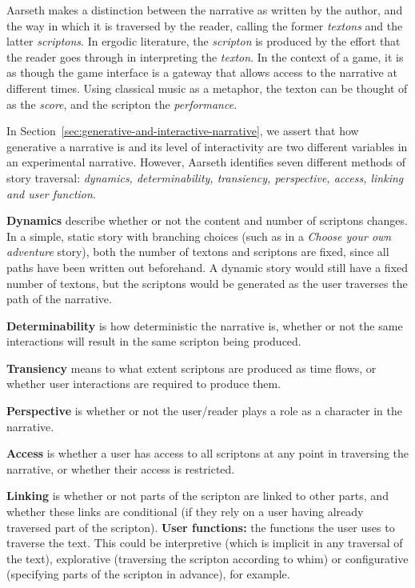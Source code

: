 \documentclass[11pt]{report}
\begin{document}
Aarseth makes a distinction between the narrative as written by the author, and the way in which it is traversed by the reader, calling the former \emph{textons} and the latter \emph{scriptons}. In ergodic literature, the \emph{scripton} is produced by the effort that the reader goes through in interpreting the \emph{texton}. In the context of a game, it is as though the game interface is a gateway that allows access to the narrative at different times. Using classical music as a metaphor, the texton can be thought of as the \emph{score}, and the scripton the \emph{performance}.

In Section~\ref{sec:generative-and-interactive-narrative}, we assert that how generative a narrative is and its level of interactivity are two different variables in an experimental narrative. However, Aarseth identifies seven different methods of story traversal: \emph{dynamics, determinability, transiency, perspective, access, linking and user function}.

\textbf{Dynamics} describe whether or not the content and number of scriptons changes. In a simple, static story with branching choices (such as in a \emph{Choose your own adventure} story), both the number of textons and scriptons are fixed, since all paths have been written out beforehand. A dynamic story would still have a fixed number of textons, but the scriptons would be generated as the user traverses the path of the narrative.

\textbf{Determinability} is how deterministic the narrative is, whether or not the same interactions will result in the same scripton being produced.

\textbf{Transiency} means to what extent scriptons are produced as time flows, or whether user interactions are required to produce them.

\textbf{Perspective} is whether or not the user/reader plays a role as a character in the narrative.

\textbf{Access} is whether a user has access to all scriptons at any point in traversing the narrative, or whether their access is restricted.

\textbf{Linking} is whether or not parts of the scripton are linked to other parts, and whether these links are conditional (if they rely on a user having already traversed part of the scripton).
\textbf{User functions:} the functions the user uses to traverse the text. This could be interpretive (which is implicit in any traversal of the text), explorative (traversing the scripton according to whim) or configurative (specifying parts of the scripton in advance), for example.
\end{document}
